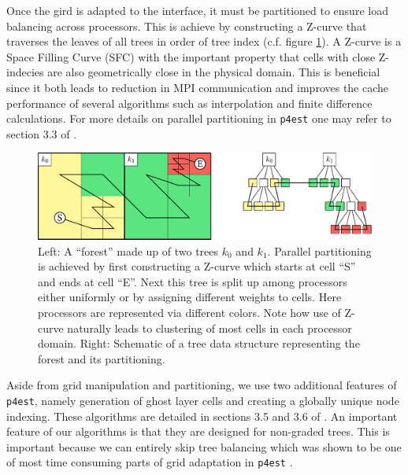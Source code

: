 Once the gird is adapted to the interface, it must be partitioned to ensure load balancing across processors. This is achieve by constructing a Z-curve that traverses the leaves of all trees in order of tree index (c.f. figure \ref{fig:p4est_zcurve}). A Z-curve is a Space Filling Curve (SFC) with the important property that cells with close Z-indecies are also geometrically close in the physical domain. This is beneficial since it both leads to reduction in MPI communication and improves the cache performance of several algorithms such as interpolation and finite difference calculations. For more details on parallel partitioning in \texttt{p4est} one may refer to section 3.3 of \cite{Burstedde;Wilcox;Ghattas:11:p4est:-Scalable-Algo}.
\begin{figure}[hbtp]
\begin{center}
\includegraphics[width = \columnwidth]{figures/p4est_zcurve.pdf}
\caption{Left: A ``forest'' made up of two trees $k_0$ and $k_1$. Parallel partitioning is achieved by first constructing a Z-curve which starts at cell ``S'' and ends at cell ``E''. Next this tree is split up among processors either uniformly or by assigning different weights to cells. Here processors are represented via different colors. Note how use of Z-curve naturally leads to clustering of most cells in each processor domain. Right: Schematic of a tree data structure representing the forest and its partitioning.}
\label{fig:p4est_zcurve}
\end{center}
\end{figure}
Aside from grid manipulation and partitioning, we use two additional features of \texttt{p4est}, namely generation of ghost layer cells and creating a globally unique node indexing. These algorithms are detailed in sections 3.5 and 3.6 of \cite{Burstedde;Wilcox;Ghattas:11:p4est:-Scalable-Algo}. An important feature of our algorithms is that they are designed for non-graded trees. This is important because we can entirely skip tree balancing which was shown to be one of most time consuming parts of grid adaptation in \texttt{p4est} \cite{Burstedde;Wilcox;Ghattas:11:p4est:-Scalable-Algo}.

